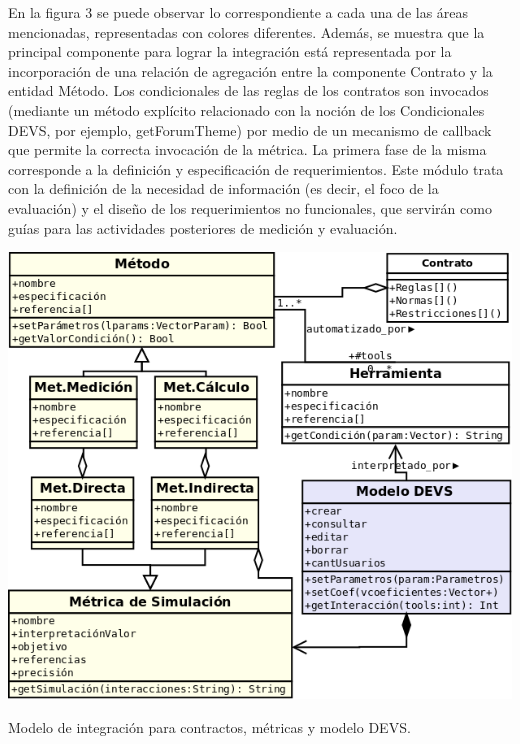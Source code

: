 En la figura 3 se puede observar lo correspondiente a cada una de las áreas
mencionadas, representadas con colores diferentes. Además, se muestra que la
principal componente para lograr la integración está representada por la
incorporación de una relación de agregación entre la componente Contrato y la
entidad Método. Los condicionales de las reglas de los contratos son invocados
(mediante un método explícito relacionado con la noción de los Condicionales
DEVS, por ejemplo, getForumTheme) por medio de un mecanismo de callback que
permite la correcta invocación de la métrica.
La primera fase de la misma corresponde a la definición y especificación de
requerimientos. Este módulo trata con la definición de la necesidad de
información (es decir, el foco de la evaluación) y el diseño de los
requerimientos no funcionales, que servirán como guías para las actividades
posteriores de medición y evaluación.



\begin{center}
 \includegraphics[width=3 in,totalheight=4 in] {Ch9/f3}
\end{center}
\caption{Modelo de integración para contractos, métricas y modelo DEVS.}

